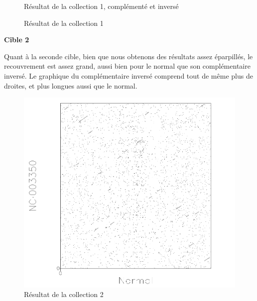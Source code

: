 \begin{figure}[!ht]
\begin{minipage}[c]{.46 \linewidth}
\begin{center}
			Résultat de la collection 1, complémenté et inversé
		\end{center}
	\end{minipage}
	\caption{Résultat de la collection 1}
\end{figure}

\FloatBarrier

\noindent\textbf{Cible 2}

Quant à la seconde cible, bien que nous obtenons des résultats assez éparpillés,
le recouvrement est assez grand, aussi bien pour le normal que son
complémentaire inversé.
Le graphique du complémentaire inversé comprend tout de même plus de droites, et
plus longues aussi que le normal.

\begin{figure}[!ht]
	\begin{minipage}[r]{.46\linewidth}
		\begin{center}
		\includegraphics[scale= 0.4]{../res/cible2.png}
		Résultat de la collection 2
	\end{center}
\end{minipage} \hfill
\begin{minipage}[c]{.46 \linewidth}
	\begin{center}

\end{center}
\end{minipage}
\end{figure}

